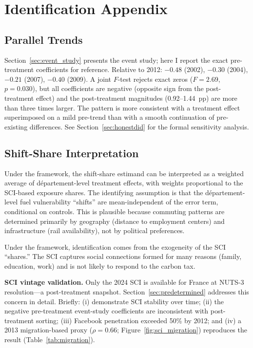 \documentclass[12pt]{article}
\newcommand{\dept}{d\'{e}partement}
\begin{document}
\section{Identification Appendix}
\label{app:identification}

\subsection{Parallel Trends}

Section~\ref{sec:event_study} presents the event study; here I report the exact pre-treatment coefficients for reference. Relative to 2012: $-0.48$ (2002), $-0.30$ (2004), $-0.21$ (2007), $-0.40$ (2009). A joint $F$-test rejects exact zeros ($F = 2.69$, $p = 0.030$), but all coefficients are negative (opposite sign from the post-treatment effect) and the post-treatment magnitudes (0.92--1.44~pp) are more than three times larger. The pattern is more consistent with a treatment effect superimposed on a mild pre-trend than with a smooth continuation of pre-existing differences. See Section~\ref{sec:honestdid} for the formal sensitivity analysis.

\subsection{Shift-Share Interpretation}

Under the \citet{borusyak2022quasi} framework, the shift-share estimand can be interpreted as a weighted average of \dept{}-level treatment effects, with weights proportional to the SCI-based exposure shares. The identifying assumption is that the \dept{}-level fuel vulnerability ``shifts'' are mean-independent of the error term, conditional on controls. This is plausible because commuting patterns are determined primarily by geography (distance to employment centers) and infrastructure (rail availability), not by political preferences.

Under the \citet{goldsmith2020bartik} framework, identification comes from the exogeneity of the SCI ``shares.'' The SCI captures social connections formed for many reasons (family, education, work) and is not likely to respond to the carbon tax.

\textbf{SCI vintage validation.} Only the 2024 SCI is available for France at NUTS-3 resolution---a post-treatment snapshot. Section~\ref{sec:predetermined} addresses this concern in detail. Briefly: (i) \citet{bailey2018social} demonstrate SCI stability over time; (ii) the negative pre-treatment event-study coefficients are inconsistent with post-treatment sorting; (iii) Facebook penetration exceeded 50\% by 2012; and (iv) a 2013 migration-based proxy ($\rho = 0.66$; Figure~\ref{fig:sci_migration}) reproduces the result (Table~\ref{tab:migration}).
\end{document}
